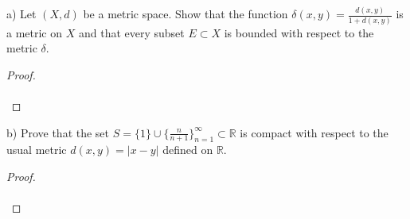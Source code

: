 a) Let $(X, d)$ be a metric space. Show that the function $\delta(x, y) = \frac{d(x, y)}{1 + d(x, y)}$ is a metric on 
   $X$ and that every subset $E \subset X$ is bounded with respect to the metric $\delta$.

\begin{proof}\renewcommand{\qedsymbol}{}\ \\\\
\end{proof}

\pagebreak

b) Prove that the set $S = \{1\} \cup \{ \frac{n}{n+1} \}_{n=1}^{\infty} \subset \mathbb{R}$ is compact with respect to the
   usual metric $d(x, y) = |x - y|$ defined on $\mathbb{R}$.

\begin{proof}\renewcommand{\qedsymbol}{}\ \\\\
\end{proof}
